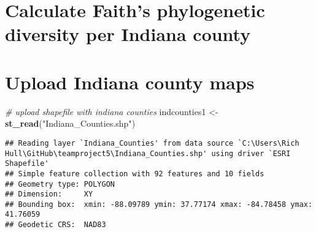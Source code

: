 \documentclass[
]{article}
\newenvironment{Shaded}{\begin{snugshade}}{\end{snugshade}}
\newcommand{\CommentTok}[1]{\textcolor[rgb]{0.56,0.35,0.01}{\textit{#1}}}
\newcommand{\DataTypeTok}[1]{\textcolor[rgb]{0.13,0.29,0.53}{#1}}
\newcommand{\KeywordTok}[1]{\textcolor[rgb]{0.13,0.29,0.53}{\textbf{#1}}}
\newcommand{\NormalTok}[1]{#1}
\newcommand{\OperatorTok}[1]{\textcolor[rgb]{0.81,0.36,0.00}{\textbf{#1}}}
\newcommand{\OtherTok}[1]{\textcolor[rgb]{0.56,0.35,0.01}{#1}}
\newcommand{\StringTok}[1]{\textcolor[rgb]{0.31,0.60,0.02}{#1}}
\begin{document}
\hypertarget{calculate-faiths-phylogenetic-diversity-per-indiana-county}{%
\section{Calculate Faith's phylogenetic diversity per Indiana
county}\label{calculate-faiths-phylogenetic-diversity-per-indiana-county}}

\begin{Shaded}
\end{Shaded}

\hypertarget{upload-indiana-county-maps}{%
\section{Upload Indiana county maps}\label{upload-indiana-county-maps}}

\begin{Shaded}
\begin{Highlighting}[]
\CommentTok{# upload shapefile with indiana counties}
\NormalTok{indcounties1 <-}\StringTok{ }\KeywordTok{st_read}\NormalTok{(}\StringTok{"Indiana_Counties.shp"}\NormalTok{)}
\end{Highlighting}
\end{Shaded}

\begin{verbatim}
## Reading layer `Indiana_Counties' from data source `C:\Users\Rich Hull\GitHub\teamproject5\Indiana_Counties.shp' using driver `ESRI Shapefile'
## Simple feature collection with 92 features and 10 fields
## Geometry type: POLYGON
## Dimension:     XY
## Bounding box:  xmin: -88.09789 ymin: 37.77174 xmax: -84.78458 ymax: 41.76059
## Geodetic CRS:  NAD83
\end{verbatim}
\end{document}
